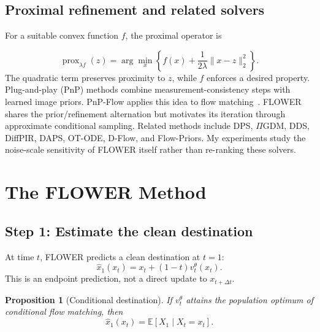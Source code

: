 \documentclass[11pt,a4paper]{article}
\newtheorem{proposition}{Proposition}
\newcommand{\E}{\mathbb{E}}
\newcommand{\Dx}{\Delta t}
\begin{document}

\subsection{Proximal refinement and related solvers}
For a suitable convex function $f$, the proximal operator is

\begin{equation}
    \operatorname{prox}_{\lambda f}(z)
    =
    \arg\min_x
    \left\{
        f(x)
        +
        \frac{1}{2\lambda}\|x-z\|_2^2
    \right\}.
    \label{eq:prox}
\end{equation}
The quadratic term preserves proximity to $z$,
while $f$ enforces a desired property.
Plug-and-play (PnP) methods combine measurement-consistency steps
with learned image priors. PnP-Flow applies this idea to flow
matching~\cite{pnpflow}.
FLOWER shares the prior/refinement alternation but motivates its
iteration through approximate conditional sampling.
Related methods include DPS, $\Pi$GDM, DDS, DiffPIR, DAPS,
OT-ODE, D-Flow, and Flow-Priors.
My experiments study the noise-scale sensitivity of FLOWER itself
rather than re-ranking these solvers.



\section{The FLOWER Method}


\subsection{Step 1: Estimate the clean destination}
At time $t$, FLOWER predicts a clean destination at $t=1$:
\begin{equation}
    \widehat x_1(x_t)
    =
    x_t+(1-t)v_t^\theta(x_t).
    \label{eq:destination}
\end{equation}
This is an endpoint prediction, not a direct update to $x_{t+\Dx}$.
\begin{proposition}[Conditional destination]
If $v_t^\theta$ attains the population optimum of conditional flow
matching, then
\begin{equation}
    \widehat x_1(x_t)
    =
    \E[X_1\mid X_t=x_t].
    \label{eq:prop1}
\end{equation}

\end{proposition}
\end{document}
